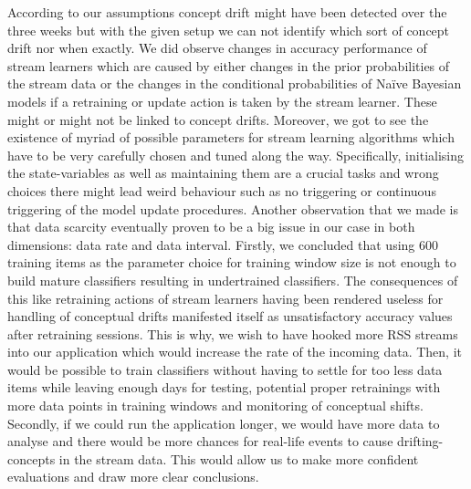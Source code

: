 \documentclass{article} %
\begin{document}
According to our assumptions concept drift might have been detected over the three weeks but with the given setup we can not identify which sort of concept drift nor when exactly. We did observe changes in accuracy performance of stream learners which are caused by either changes in the prior probabilities of the stream data or the changes in the conditional probabilities of Na\"ive Bayesian models if a retraining or update action is taken by the stream learner. These might or might not be linked to concept drifts. 
Moreover, we got to see the existence of myriad of possible parameters for stream learning algorithms which have to be very carefully chosen and tuned along the way. Specifically, initialising the state-variables as well as maintaining them are a crucial tasks and wrong choices there might lead weird behaviour such as no triggering or continuous triggering of the model update procedures. Another observation that we made is that data scarcity eventually proven to be a big issue in our case in both dimensions: data rate and data interval. Firstly, we concluded that using 600 training items as the parameter choice for training window size is not enough to build mature classifiers resulting in undertrained classifiers. The consequences of this like retraining actions of stream learners having been rendered useless for handling of conceptual drifts manifested itself as unsatisfactory accuracy values after retraining sessions. This is why, we wish to have hooked more RSS streams into our application which would increase the rate of the incoming data. Then, it would be possible to train classifiers without having to settle for too less data items while leaving enough days for testing, potential proper retrainings with more data points in training windows and monitoring of conceptual shifts. Secondly, if we could run the application longer, we would have more data to analyse and there would be more chances for real-life events to cause drifting-concepts in the stream data. This would allow us to  make more confident evaluations and draw more clear conclusions.


\small{

}
\end{document}
